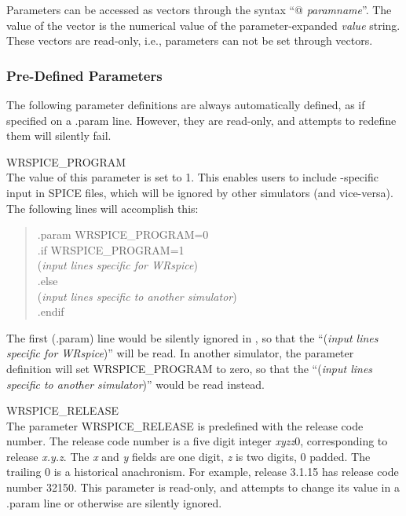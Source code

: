Parameters can be accessed as vectors through the syntax ``{\vt @}{\it
paramname}''.  The value of the vector is the numerical value of the
parameter-expanded {\it value} string.  These vectors are read-only,
i.e., parameters can not be set through vectors.

\subsubsection{Pre-Defined Parameters}

The following parameter definitions are always automatically defined,
as if specified on a {\vt .param} line.  However, they are read-only,
and attempts to redefine them will silently fail.

\begin{description}
\item{\vt WRSPICE\_PROGRAM}\\
The value of this parameter is set to 1.  This enables users to
include {\WRspice}-specific input in SPICE files, which will be
ignored by other simulators (and vice-versa).  The following lines
will accomplish this:

\begin{quote}
{\vt .param WRSPICE\_PROGRAM=0}\\
{\vt .if WRSPICE\_PROGRAM=1}\\
({\it input lines specific for WRspice\/})\\
{\vt .else}\\
({\it input lines specific to another simulator\/})\\
{\vt .endif}\\
\end{quote}

The first ({\vt .param}) line would be silently ignored in {\WRspice},
so that the ``({\it input lines specific for WRspice\/})'' will be
read.  In another simulator, the parameter definition will set {\vt
WRSPICE\_PROGRAM} to zero, so that the ``({\it input lines specific to
another simulator\/})'' would be read instead.

\item{\vt WRSPICE\_RELEASE}\\
The parameter {\vt WRSPICE\_RELEASE} is predefined with the release
code number.  The release code number is a five digit integer {\it
xyzz\/}0, corresponding to release {\it x.y.z}.  The {\it x} and {\it
y} fields are one digit, {\it z} is two digits, 0 padded.  The
trailing 0 is a historical anachronism.  For example, release 3.1.15
has release code number 32150.  This parameter is read-only, and
attempts to change its value in a {\vt .param} line or otherwise are
silently ignored.
\end{description}

